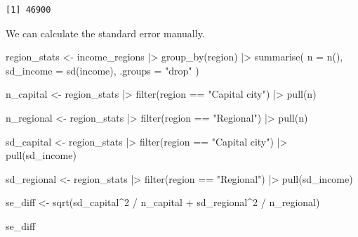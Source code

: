 \documentclass[
  letterpaper,
  DIV=11,
  numbers=noendperiod]{scrreprt}
\newenvironment{Shaded}{\begin{snugshade}}{\end{snugshade}}
\newcommand{\AttributeTok}[1]{\textcolor[rgb]{0.40,0.45,0.13}{#1}}
\newcommand{\DecValTok}[1]{\textcolor[rgb]{0.68,0.00,0.00}{#1}}
\newcommand{\FunctionTok}[1]{\textcolor[rgb]{0.28,0.35,0.67}{#1}}
\newcommand{\NormalTok}[1]{\textcolor[rgb]{0.00,0.23,0.31}{#1}}
\newcommand{\OtherTok}[1]{\textcolor[rgb]{0.00,0.23,0.31}{#1}}
\newcommand{\SpecialCharTok}[1]{\textcolor[rgb]{0.37,0.37,0.37}{#1}}
\newcommand{\StringTok}[1]{\textcolor[rgb]{0.13,0.47,0.30}{#1}}
\begin{document}
\begin{verbatim}
[1] 46900
\end{verbatim}

We can calculate the standard error manually.

\begin{Shaded}
\begin{Highlighting}[]
\NormalTok{region\_stats }\OtherTok{\textless{}{-}}\NormalTok{ income\_regions }\SpecialCharTok{|\textgreater{}}
  \FunctionTok{group\_by}\NormalTok{(region) }\SpecialCharTok{|\textgreater{}}
  \FunctionTok{summarise}\NormalTok{(}
    \AttributeTok{n =} \FunctionTok{n}\NormalTok{(),}
    \AttributeTok{sd\_income =} \FunctionTok{sd}\NormalTok{(income),}
    \AttributeTok{.groups =} \StringTok{"drop"}
\NormalTok{  )}

\NormalTok{n\_capital }\OtherTok{\textless{}{-}}\NormalTok{ region\_stats }\SpecialCharTok{|\textgreater{}}
  \FunctionTok{filter}\NormalTok{(region }\SpecialCharTok{==} \StringTok{"Capital city"}\NormalTok{) }\SpecialCharTok{|\textgreater{}}
  \FunctionTok{pull}\NormalTok{(n)}

\NormalTok{n\_regional }\OtherTok{\textless{}{-}}\NormalTok{ region\_stats }\SpecialCharTok{|\textgreater{}}
  \FunctionTok{filter}\NormalTok{(region }\SpecialCharTok{==} \StringTok{"Regional"}\NormalTok{) }\SpecialCharTok{|\textgreater{}}
  \FunctionTok{pull}\NormalTok{(n)}

\NormalTok{sd\_capital }\OtherTok{\textless{}{-}}\NormalTok{ region\_stats }\SpecialCharTok{|\textgreater{}}
  \FunctionTok{filter}\NormalTok{(region }\SpecialCharTok{==} \StringTok{"Capital city"}\NormalTok{) }\SpecialCharTok{|\textgreater{}}
  \FunctionTok{pull}\NormalTok{(sd\_income)}

\NormalTok{sd\_regional }\OtherTok{\textless{}{-}}\NormalTok{ region\_stats }\SpecialCharTok{|\textgreater{}}
  \FunctionTok{filter}\NormalTok{(region }\SpecialCharTok{==} \StringTok{"Regional"}\NormalTok{) }\SpecialCharTok{|\textgreater{}}
  \FunctionTok{pull}\NormalTok{(sd\_income)}

\NormalTok{se\_diff }\OtherTok{\textless{}{-}} \FunctionTok{sqrt}\NormalTok{(sd\_capital}\SpecialCharTok{\^{}}\DecValTok{2} \SpecialCharTok{/}\NormalTok{ n\_capital }\SpecialCharTok{+}\NormalTok{ sd\_regional}\SpecialCharTok{\^{}}\DecValTok{2} \SpecialCharTok{/}\NormalTok{ n\_regional)}

\NormalTok{se\_diff}
\end{Highlighting}
\end{Shaded}
\end{document}
